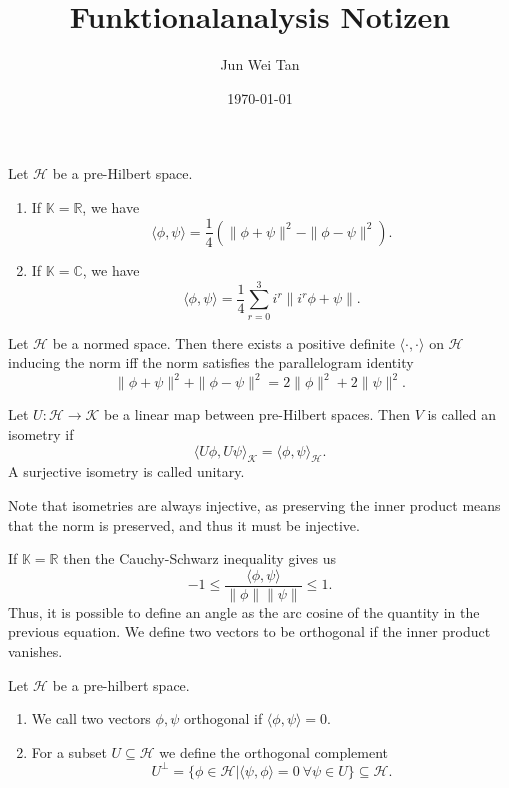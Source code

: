 \documentclass[prb,12pt]{revtex4-2}
\theoremstyle{definition}
\theoremstyle{definition}
\theoremstyle{definition}
\newenvironment{parts}{\begin{enumerate}[label=(\alph*)]}{\end{enumerate}}
\newcommand{\R}{\mathbb{R}}
\newcommand{\C}{\mathbb{C}}
\begin{document}
	\title{Funktionalanalysis Notizen}
	\author{Jun Wei Tan}
	\date{\today}
	\maketitle
	\tableofcontents
\begin{Theorem}
	Let $\mathcal{H}$ be a pre-Hilbert space.
	\begin{parts}
		\item If $\mathbb{K}=\R$, we have
			\[
			\langle \phi, \psi\rangle = \frac{1}{4}\left( \|\phi+\psi\|^2 - \|\phi - \psi\|^2 \right) 
			.\] 
		\item If $\mathbb{K}=\C$, we have
			\[
				\langle \phi, \psi\rangle = \frac{1}{4}\sum_{r=0}^3 i^r \| i^r \phi + \psi\|
			.\] 
	\end{parts}
\end{Theorem}
\begin{Theorem}
	Let $\mathcal{H}$ be a normed space. Then there exists a positive definite $\langle \cdot, \cdot \rangle$ on $\mathcal{H}$ inducing the norm iff the norm satisfies the parallelogram identity
	\[
	\|\phi+\psi\|^2 + \|\phi - \psi\|^2 = 2 \|\phi\|^2 + 2 \|\psi\|^2
	.\] 
\end{Theorem}
\begin{Definition}
	Let $U:\mathcal{H}\to \mathcal{K}$ be a linear map between pre-Hilbert spaces. Then $V$ is called an isometry if
	\[
		\langle U \phi, U \psi\rangle_{\mathcal{K}}= \langle \phi, \psi\rangle_\mathcal{H}
	.\] 
	A surjective isometry is called unitary.
\end{Definition}
Note that isometries are always injective, as preserving the inner product means that the norm is preserved, and thus it must be injective.
\begin{Definition}[Angle]
	If $\mathbb{K}=\R$ then the Cauchy-Schwarz inequality gives us
	\[
	-1 \le \frac{\langle \phi, \psi\rangle}{\|\phi\|\|\psi\|}\le 1
	.\] 
	Thus, it is possible to define an angle as the arc cosine of the quantity in the previous equation.  We define two vectors to be orthogonal if the inner product vanishes.
\end{Definition}
\begin{Definition}
	Let $\mathcal{H}$ be a pre-hilbert space.
	\begin{parts}
	\item We call two vectors $\phi,\psi$ orthogonal if $\langle \phi, \psi\rangle = 0$.
	\item For a subset $U\subseteq \mathcal{H}$ we define the orthogonal complement
		\[
		U^\perp = \{\phi\in \mathcal{H}| \langle \psi, \phi\rangle = 0~\forall \psi\in U\} \subseteq \mathcal{H}
		.\] 
	\end{parts}
\end{Definition}
\end{document}
